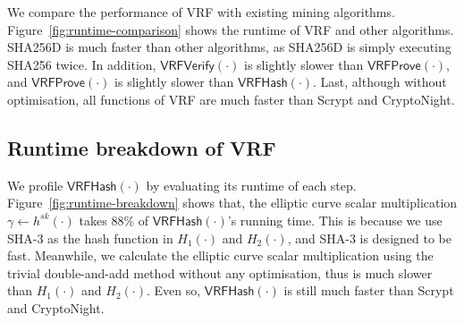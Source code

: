 We compare the performance of VRF with existing mining algorithms.
Figure~\ref{fig:runtime-comparison} shows the runtime of VRF and other algorithms.
SHA256D is much faster than other algorithms, as SHA256D is simply executing SHA256 twice.
In addition, $\mathsf{VRFVerify}(\cdot)$ is slightly slower than $\mathsf{VRFProve}(\cdot)$, and $\mathsf{VRFProve}(\cdot)$ is slightly slower than $\mathsf{VRFHash}(\cdot)$.
Last, although without optimisation, all functions of VRF are much faster than Scrypt and CryptoNight.

\subsection{Runtime breakdown of VRF}

We profile $\mathsf{VRFHash}(\cdot)$ by evaluating its runtime of each step.
Figure~\ref{fig:runtime-breakdown} shows that, the elliptic curve scalar multiplication $\gamma \gets h^{sk}(\cdot)$ takes 88\% of $\mathsf{VRFHash}(\cdot)$'s running time.
This is because we use SHA-3 as the hash function in $H_1(\cdot)$ and $H_2(\cdot)$, and SHA-3 is designed to be fast.
Meanwhile, we calculate the elliptic curve scalar multiplication using the trivial double-and-add method without any optimisation, thus is much slower than $H_1(\cdot)$ and $H_2(\cdot)$.
Even so, $\mathsf{VRFHash}(\cdot)$ is still much faster than Scrypt and CryptoNight.